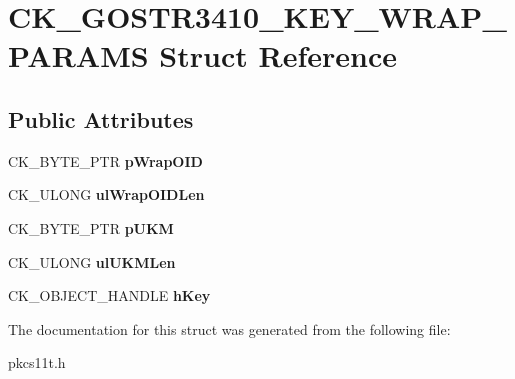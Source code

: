 \hypertarget{struct_c_k___g_o_s_t_r3410___k_e_y___w_r_a_p___p_a_r_a_m_s}{}\section{C\+K\+\_\+\+G\+O\+S\+T\+R3410\+\_\+\+K\+E\+Y\+\_\+\+W\+R\+A\+P\+\_\+\+P\+A\+R\+A\+MS Struct Reference}
\label{struct_c_k___g_o_s_t_r3410___k_e_y___w_r_a_p___p_a_r_a_m_s}
\subsection*{Public Attributes}
\begin{DoxyCompactItemize}
\item 
\mbox{\label{struct_c_k___g_o_s_t_r3410___k_e_y___w_r_a_p___p_a_r_a_m_s_ad0b49c48f5a242ff6781c0ab38137b0f}} 
C\+K\+\_\+\+B\+Y\+T\+E\+\_\+\+P\+TR {\bfseries p\+Wrap\+O\+ID}
\item 
\mbox{\label{struct_c_k___g_o_s_t_r3410___k_e_y___w_r_a_p___p_a_r_a_m_s_a0831bf1a78b7f3f4137e0b235f42c5c4}} 
C\+K\+\_\+\+U\+L\+O\+NG {\bfseries ul\+Wrap\+O\+I\+D\+Len}
\item 
\mbox{\label{struct_c_k___g_o_s_t_r3410___k_e_y___w_r_a_p___p_a_r_a_m_s_ad26392f28b2095f1730bc47a8cbc4221}} 
C\+K\+\_\+\+B\+Y\+T\+E\+\_\+\+P\+TR {\bfseries p\+U\+KM}
\item 
\mbox{\label{struct_c_k___g_o_s_t_r3410___k_e_y___w_r_a_p___p_a_r_a_m_s_a783109c3f3eefa191ab85a04194789a9}} 
C\+K\+\_\+\+U\+L\+O\+NG {\bfseries ul\+U\+K\+M\+Len}
\item 
\mbox{\label{struct_c_k___g_o_s_t_r3410___k_e_y___w_r_a_p___p_a_r_a_m_s_a54e8a52eefdf28a18d19425a3f5542f3}} 
C\+K\+\_\+\+O\+B\+J\+E\+C\+T\+\_\+\+H\+A\+N\+D\+LE {\bfseries h\+Key}
\end{DoxyCompactItemize}


The documentation for this struct was generated from the following file\+:\begin{DoxyCompactItemize}
\item 
pkcs11t.\+h\end{DoxyCompactItemize}
